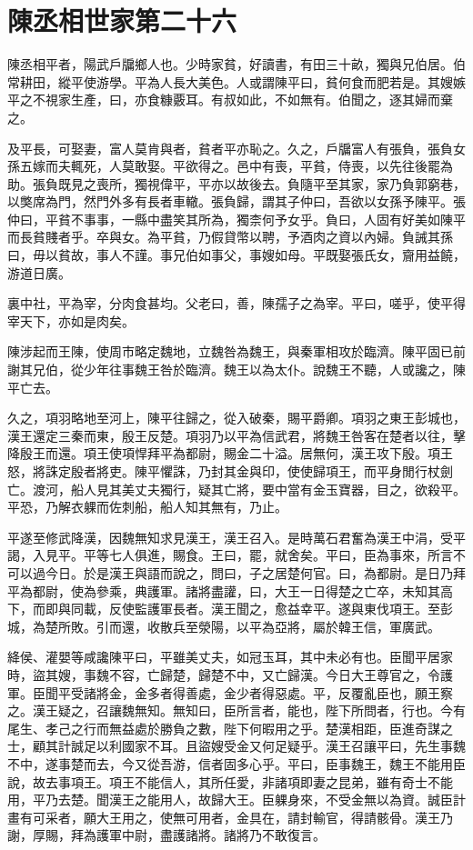 \chapter{陳丞相世家第二十六}

陳丞相平者，陽武戶牖鄉人也。少時家貧，好讀書，有田三十畝，獨與兄伯居。伯常耕田，縱平使游學。平為人長大美色。人或謂陳平曰，貧何食而肥若是。其嫂嫉平之不視家生產，曰，亦食糠覈耳。有叔如此，不如無有。伯聞之，逐其婦而棄之。

及平長，可娶妻，富人莫肯與者，貧者平亦恥之。久之，戶牖富人有張負，張負女孫五嫁而夫輒死，人莫敢娶。平欲得之。邑中有喪，平貧，侍喪，以先往後罷為助。張負既見之喪所，獨視偉平，平亦以故後去。負隨平至其家，家乃負郭窮巷，以獘席為門，然門外多有長者車轍。張負歸，謂其子仲曰，吾欲以女孫予陳平。張仲曰，平貧不事事，一縣中盡笑其所為，獨柰何予女乎。負曰，人固有好美如陳平而長貧賤者乎。卒與女。為平貧，乃假貸幣以聘，予酒肉之資以內婦。負誡其孫曰，毋以貧故，事人不謹。事兄伯如事父，事嫂如母。平既娶張氏女，齎用益饒，游道日廣。

裏中社，平為宰，分肉食甚均。父老曰，善，陳孺子之為宰。平曰，嗟乎，使平得宰天下，亦如是肉矣。

陳涉起而王陳，使周市略定魏地，立魏咎為魏王，與秦軍相攻於臨濟。陳平固已前謝其兄伯，從少年往事魏王咎於臨濟。魏王以為太仆。說魏王不聽，人或讒之，陳平亡去。

久之，項羽略地至河上，陳平往歸之，從入破秦，賜平爵卿。項羽之東王彭城也，漢王還定三秦而東，殷王反楚。項羽乃以平為信武君，將魏王咎客在楚者以往，擊降殷王而還。項王使項悍拜平為都尉，賜金二十溢。居無何，漢王攻下殷。項王怒，將誅定殷者將吏。陳平懼誅，乃封其金與印，使使歸項王，而平身閒行杖劍亡。渡河，船人見其美丈夫獨行，疑其亡將，要中當有金玉寶器，目之，欲殺平。平恐，乃解衣躶而佐刺船，船人知其無有，乃止。

平遂至修武降漢，因魏無知求見漢王，漢王召入。是時萬石君奮為漢王中涓，受平謁，入見平。平等七人俱進，賜食。王曰，罷，就舍矣。平曰，臣為事來，所言不可以過今日。於是漢王與語而說之，問曰，子之居楚何官。曰，為都尉。是日乃拜平為都尉，使為參乘，典護軍。諸將盡讙，曰，大王一日得楚之亡卒，未知其高下，而即與同載，反使監護軍長者。漢王聞之，愈益幸平。遂與東伐項王。至彭城，為楚所敗。引而還，收散兵至滎陽，以平為亞將，屬於韓王信，軍廣武。

絳侯、灌嬰等咸讒陳平曰，平雖美丈夫，如冠玉耳，其中未必有也。臣聞平居家時，盜其嫂，事魏不容，亡歸楚，歸楚不中，又亡歸漢。今日大王尊官之，令護軍。臣聞平受諸將金，金多者得善處，金少者得惡處。平，反覆亂臣也，願王察之。漢王疑之，召讓魏無知。無知曰，臣所言者，能也，陛下所問者，行也。今有尾生、孝己之行而無益處於勝負之數，陛下何暇用之乎。楚漢相距，臣進奇謀之士，顧其計誠足以利國家不耳。且盜嫂受金又何足疑乎。漢王召讓平曰，先生事魏不中，遂事楚而去，今又從吾游，信者固多心乎。平曰，臣事魏王，魏王不能用臣說，故去事項王。項王不能信人，其所任愛，非諸項即妻之昆弟，雖有奇士不能用，平乃去楚。聞漢王之能用人，故歸大王。臣躶身來，不受金無以為資。誠臣計畫有可采者，願大王用之，使無可用者，金具在，請封輸官，得請骸骨。漢王乃謝，厚賜，拜為護軍中尉，盡護諸將。諸將乃不敢復言。

